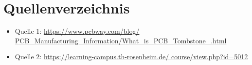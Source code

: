 \documentclass[a4paper,12pt]{article}
\begin{document}
\newpage


\newpage
\tableofcontents		%
\newpage


\newpage

\newpage

\newpage

\newpage


\newpage
\listoffigures %
\newpage

\section*{Quellenverzeichnis}
\begin{itemize}
    \item Quelle 1: \url{https://www.pcbway.com/blog/
    PCB_Manufacturing_Information/What_is_PCB_Tombstone_.html}
    \item Quelle 2: \url{https://learning-campus.th-rosenheim.de/
    course/view.php?id=5012}
\end{itemize}
\end{document}

